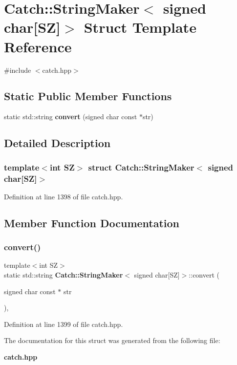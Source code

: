 \section{Catch\+::String\+Maker$<$ signed char[SZ]$>$ Struct Template Reference}
\label{struct_catch_1_1_string_maker_3_01signed_01char[_s_z]_4}


{\ttfamily \#include $<$catch.\+hpp$>$}

\subsection*{Static Public Member Functions}
\begin{DoxyCompactItemize}
\item 
static std\+::string \textbf{ convert} (signed char const $\ast$str)
\end{DoxyCompactItemize}


\subsection{Detailed Description}
\subsubsection*{template$<$int SZ$>$\newline
struct Catch\+::\+String\+Maker$<$ signed char[\+S\+Z]$>$}



Definition at line 1398 of file catch.\+hpp.



\subsection{Member Function Documentation}
\mbox{\label{struct_catch_1_1_string_maker_3_01signed_01char[_s_z]_4_a23ac689cc79dbcfe9b1765fe9e25690e}} 
\subsubsection{convert()}
{\footnotesize\ttfamily template$<$int SZ$>$ \\
static std\+::string \textbf{ Catch\+::\+String\+Maker}$<$ signed char[SZ]$>$\+::convert (\begin{DoxyParamCaption}\item[{signed char const $\ast$}]{str }\end{DoxyParamCaption})\hspace{0.3cm}{\ttfamily [inline]}, {\ttfamily [static]}}



Definition at line 1399 of file catch.\+hpp.



The documentation for this struct was generated from the following file\+:\begin{DoxyCompactItemize}
\item 
\textbf{ catch.\+hpp}\end{DoxyCompactItemize}
